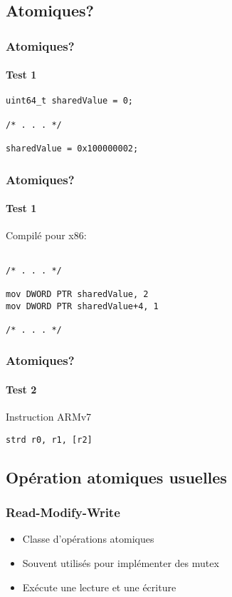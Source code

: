\documentclass{beamer}
\begin{document}
\subsection{Atomiques?}
\begin{frame}[fragile]
\frametitle{Atomiques?}
\framesubtitle{Test 1}
\begin{lstlisting}
uint64_t sharedValue = 0;

/* . . . */

sharedValue = 0x100000002;
\end{lstlisting}
\end{frame}

\begin{frame}[fragile]
\frametitle{Atomiques?}
\framesubtitle{Test 1}
Compilé pour x86:
\begin{lstlisting}

/* . . . */

mov	DWORD PTR sharedValue, 2
mov	DWORD PTR sharedValue+4, 1

/* . . . */
\end{lstlisting}
\end{frame}

\begin{frame}[fragile]
\frametitle{Atomiques?}
\framesubtitle{Test 2}
Instruction ARMv7

\begin{lstlisting}
strd r0, r1, [r2]
\end{lstlisting}

\end{frame}

\subsection{Opération atomiques usuelles}
\begin{frame}
\frametitle{Read-Modify-Write}
\begin{itemize}
\item Classe d'opérations atomiques
\item Souvent utilisés pour implémenter des mutex
\item Exécute une lecture et une écriture
\end{itemize}
\end{frame}
\end{document}
